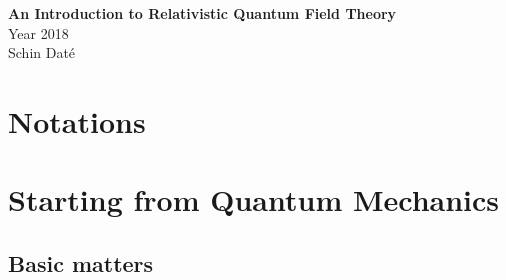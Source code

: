 \documentclass[12pt]{article}
\newcommand{\myqftsrcdirectory}[0]{myqft/src}
\newcounter{problem}
\begin{document}
\begin{titlepage} 
\vspace*{3cm}
\vspace*{2cm}
\noindent
\begin{center}
{\Huge \bf An Introduction to Relativistic Quantum Field Theory\\}  
\vspace{1cm}
{\large Year 2018}
\vspace{1cm}
\\
{\Large 
Schin Dat\'e}
\end{center}
\end{titlepage} 



\tableofcontents

\thispagestyle{empty}



\setcounter{page}{0}
\setcounter{section}{-1}

\newpage %

\section{Notations}
\label{sec:Notations}
%


\setcounter{footnote}{0}
\setcounter{equation}{0}
\setcounter{figure}{0}
\setcounter{problem}{0}

\newpage
\section{Starting from Quantum Mechanics}
\subsection{Basic matters}

\end{document}
